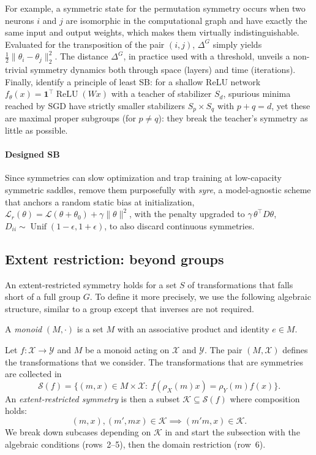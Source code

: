 \documentclass[mathematics,review,submit,moreauthors]{Definitions/mdpi}
\begin{document}
For example, a symmetric state for the permutation symmetry occurs when two neurons $i$ and $j$ are isomorphic in the computational graph and have exactly the same input and output weights, which makes them virtually indistinguishable.
Evaluated for the transposition of the pair $(i,j)$, $\Delta^G$ simply yields $\frac12\| \theta_i - \theta_j \|_2^2$.
The distance $\Delta^G$, in practice used with a threshold, unveils a non-trivial symmetry dynamics both through space (layers) and time (iterations).
Finally, \citet{arjevani2023} identify a principle of least SB: for a shallow ReLU network $f_\theta(x)=\mathbf 1^\top\operatorname{ReLU}(Wx)$ with a teacher of stabilizer $S_d$, spurious minima reached by SGD have strictly smaller stabilizers $S_p\times S_q$ with $p+q=d$, yet these are maximal proper subgroups (for $p\neq q$): they break the teacher's symmetry as little as possible.

\paragraph{Designed SB}
Since symmetries can slow optimization and trap training at low-capacity symmetric saddles, \citet{ziyin2024b} remove them purposefully with \emph{syre}, a model-agnostic scheme that anchors a random static bias at initialization, $\mathcal{L}_r(\theta)=\mathcal{L}(\theta+\theta_0)+\gamma\|\theta\|^2$, with the penalty upgraded to $\gamma\,\theta^\top D\theta$, $D_{ii}\sim\operatorname{Unif}(1-\epsilon,1+\epsilon)$, to also discard continuous symmetries.


\subsection{Extent restriction: beyond groups}\label{sec:extent-restriction}
An extent-restricted symmetry holds for a set $S$ of transformations that falls short of a full group $G$.
To define it more precisely, we use the following algebraic structure, similar to a group except that inverses are not required.
\begin{Definition}
    A \emph{monoid} $(M,\cdot)$ is a set $M$ with an associative product and identity $e\in M$.
\end{Definition}
Let $f:\mathcal X\to\mathcal Y$ and $M$ be a monoid acting on $\mathcal{X}$ and $\mathcal{Y}$.
The pair $(M,\mathcal{X})$ defines the transformations that we consider.
The transformations that are symmetries are collected in
$$
    \mathcal S(f)=\{(m,x)\in M\times\mathcal X:\ f(\rho_X(m)x)=\rho_Y(m)f(x)\}.
$$
An \emph{extent-restricted symmetry} is then a subset $\mathcal K\subseteq \mathcal S(f)$ where composition holds:
$$
    (m,x), (m',mx)\in \mathcal K \implies (m'm,x)\in \mathcal K.
$$
We break down subcases depending on $\mathcal K$ in  and start the subsection with the algebraic conditions (rows~2--5), then the domain restriction (row~6).
\end{document}
